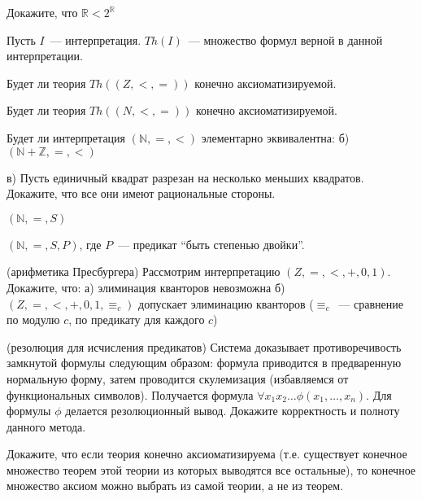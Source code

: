 \setcounter{curtask}{24}


\begin{task}
    Докажите, что $\mathbb{R} < 2^{\mathbb{R}}$
\end{task}

Пусть $I$~--- интерпретация. $Th(I)$~--- множество формул верной в
данной интерпретации.
\begin{task}
    Будет ли теория $Th((Z, <, =))$ конечно аксиоматизируемой.
\end{task}

\begin{task}
    Будет ли теория $Th((N, <, =))$ конечно аксиоматизируемой.
\end{task}


\breakline

\begin{ptask}{13}
    Будет ли интерпретация $(\mathbb{N}, =, <)$ элементарно
    эквивалентна:
    б) $(\mathbb{N} + \mathbb{Z}, =, <)$
\end{ptask}

\begin{ptask}{14}
    в) Пусть единичный квадрат разрезан на несколько меньших
    квадратов. Докажите, что все они имеют рациональные стороны.
\end{ptask}

\begin{ptask}{19}
    $(\mathbb{N}, =, S)$
\end{ptask}

\begin{ptask}{20}
    $(\mathbb{N}, =, S, P)$, где $P$~--- предикат ``быть степенью двойки''.
\end{ptask}

\begin{ptask}{21}(арифметика Пресбургера)
    Рассмотрим интерпретацию $(Z, =, <, +, 0, 1)$.
    Докажите, что:
    а) элиминация кванторов невозможна
    б) $(Z, =, <, +, 0, 1, \equiv_c)$ допускает элиминацию кванторов
    ($\equiv_c$~--- сравнение по модулю $c$, по предикату для каждого $c$)
\end{ptask}

\begin{ptask}{22}(резолюция для исчисления предикатов)
    Система доказывает противоречивость замкнутой формулы следующим
    образом: формула приводится в предваренную нормальную форму, затем
    проводится скулемизация (избавляемся от функциональных
    символов). Получается формула $\forall x_1 x_2 \dots
    \phi(x_1, \dots, x_n)$. Для формулы $\phi$ делается резолюционный
    вывод. Докажите корректность и полноту данного метода.
\end{ptask}

\begin{ptask}{29}
    Докажите, что если теория конечно аксиоматизируема
    (т.е. существует конечное множество теорем этой теории из которых выводятся все
    остальные), то конечное множество аксиом можно выбрать из самой
    теории, а не из теорем.
\end{ptask}